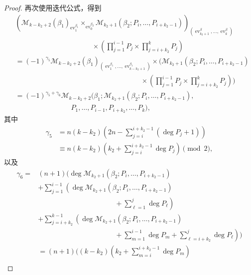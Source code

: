 \begin{proof}
再次使用迭代公式，得到
\[
\begin{aligned}
 &\left(
 \mathcal M_{k-k_2+2}(\beta_1)_
 {\operatorname{ev}_1^{\beta_1}}
 \mathop{\times}_{\operatorname{ev}_0^{\beta_2}}
 \mathcal M_{k_2+1}
 (\beta_2;P_i,\ldots,P_{i+k_2-1})
 \right)_
 {(\operatorname{ev}_{k_2+1}^\beta,\ldots,
   \operatorname{ev}_{k}^\beta)}\\[-2pt]
 &\hspace{11em}{}\times
 \left(\prod_{j=1}^{i-1}P_j\times
 \prod_{j=i+k_2}^{k}P_j\right)\\
 &={}
 (-1)^{\gamma_5}
 \mathcal M_{k-k_2+2}(\beta_1)_
 {(\operatorname{ev}_1^{\beta_1},\ldots,
   \operatorname{ev}_{k-k_2+1}^{\beta_1})}
 \times\Bigg(
 \mathcal M_{k_2+1}(\beta_2;P_i,\ldots,P_{i+k_2-1})\\[-2pt]
 &\hspace{18em}{}\times
 \left(\prod_{j=1}^{i-1}P_j\times
 \prod_{j=i+k_2}^{k}P_j\right)\Bigg)\\
 &={}
 (-1)^{\gamma_5+\gamma_6}
 \mathcal M_{k-k_2+2}
 \bigl(\beta_1;
 \mathcal M_{k_2+1}(\beta_2;P_i,\ldots,P_{i+k_2-1}),\\[-2pt]
 &\hspace{8em}P_1,\ldots,P_{i-1},
 P_{i+k_2},\ldots,P_k\bigr),
\end{aligned}
\]
其中
\[
\begin{aligned}
 \gamma_5
 &=n(k-k_2)\left(2n-
   \sum_{j=i}^{i+k_2-1}(\deg P_j+1)\right)\\
 &\equiv n(k-k_2)\left(k_2+
   \sum_{j=i}^{i+k_2-1}\deg P_j\right)\pmod2,
\end{aligned}
\]
以及
\[
\begin{aligned}
 \gamma_6
 ={}&(n+1)\Bigg(
 \deg\mathcal M_{k_2+1}(\beta_2;P_i,\ldots,P_{i+k_2-1})\\
 &+\sum_{j=1}^{i-1}\left(
   \deg\mathcal M_{k_2+1}(\beta_2;P_i,\ldots,P_{i+k_2-1})\right.\\[-2pt]
 &\hspace{11em}\left.{}+
   \sum_{\ell=1}^{j}\deg P_\ell\right)\\
 &+\sum_{j=i+k_2}^{k-1}\left(
   \deg\mathcal M_{k_2+1}(\beta_2;P_i,\ldots,P_{i+k_2-1})\right.\\[-2pt]
 &\hspace{11em}\left.{}+
   \sum_{m=1}^{i-1}\deg P_m
   +\sum_{\ell=i+k_2}^{j}\deg P_\ell\right)\Bigg)\\
 &=(n+1)\Bigg(
 (k-k_2)\left(k_2+
   \sum_{m=i}^{i+k_2-1}\deg P_m\right)\\
 &\hspace{5em}{}

\end{aligned}\]
\end{proof}
